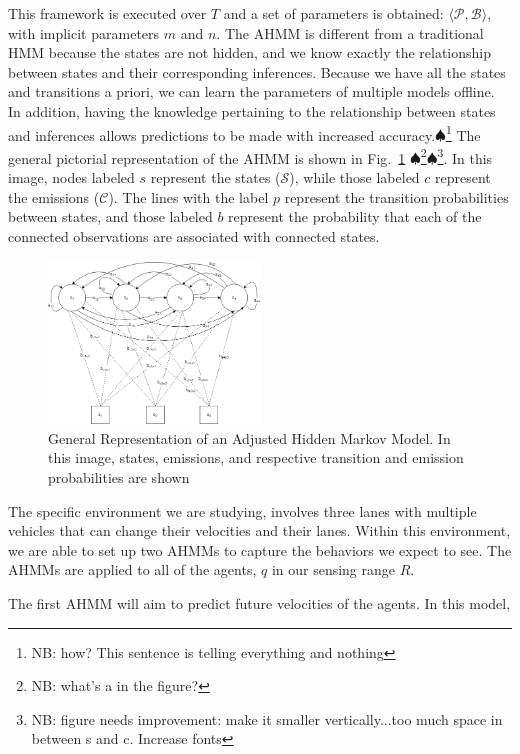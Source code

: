 \documentclass[letterpaper, 10 pt, conference]{ieeeconf}  %
\newcommand\NB[1]{$\spadesuit$\footnote{NB: #1}}
\begin{document}
This framework is executed over $T$ and a set of parameters is obtained: $\langle \mathcal{P}, \mathcal{B} \rangle$, with implicit parameters $m$ and $n$. The AHMM is different from a traditional HMM because the states are not hidden, and we know exactly the relationship
between states and their corresponding inferences. Because we have all the states and transitions a priori, we can learn the parameters of multiple models offline. In addition, having the knowledge pertaining to the relationship between states and inferences allows predictions to be made with increased accuracy.\NB{how? This sentence is telling everything and nothing}
The general pictorial representation of the AHMM is shown in Fig.~\ref{fig:hmm} \NB{what's a in the figure?}\NB{figure needs improvement: make it smaller vertically...too much space in between s and c. Increase fonts}. In this image, nodes labeled $s$ represent the states ($\mathcal{S}$), while those labeled $c$ represent the emissions ($\mathcal{C}$). The lines with the label $p$ represent the transition probabilities between states, and those labeled $b$ represent the probability that each of the connected observations are associated with connected states.

\begin{figure}[ht]
    \includegraphics[width=0.5\textwidth]{ahmm.png}
    \caption{General Representation of an Adjusted Hidden Markov Model. In this image, states, emissions, and respective transition and emission probabilities are shown}
    \label{fig:hmm}
\end{figure}

The specific environment we are studying, involves three lanes with multiple vehicles that can change their velocities and their lanes. Within this environment, we are able to set up two AHMMs to capture the behaviors we expect to see. The AHMMs are applied to all of the agents, $q$ in our sensing range $R$.

The first AHMM will aim to predict future velocities of the agents. In this model,
\end{document}
